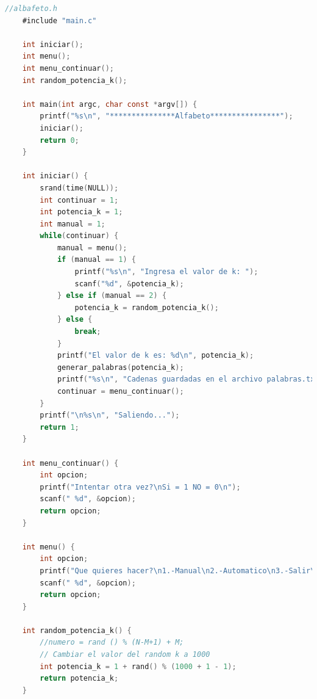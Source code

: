 	\begin{lstlisting}[language=C]
	//albafeto.h
	#include "main.c"
	
	int iniciar();
	int menu();
	int menu_continuar();
	int random_potencia_k();
	
	int main(int argc, char const *argv[]) {
		printf("%s\n", "***************Alfabeto****************");
		iniciar();
		return 0;
	}
	
	int iniciar() {
		srand(time(NULL));
		int continuar = 1;
		int potencia_k = 1;
		int manual = 1;
		while(continuar) {
			manual = menu();
			if (manual == 1) {
				printf("%s\n", "Ingresa el valor de k: ");
				scanf("%d", &potencia_k);
			} else if (manual == 2) {
				potencia_k = random_potencia_k();
			} else {
				break;
			}
			printf("El valor de k es: %d\n", potencia_k);
			generar_palabras(potencia_k);
			printf("%s\n", "Cadenas guardadas en el archivo palabras.txt");
			continuar = menu_continuar();
		}
		printf("\n%s\n", "Saliendo...");
		return 1;
	}
	
	int menu_continuar() {
		int opcion;
		printf("Intentar otra vez?\nSi = 1 NO = 0\n");
		scanf(" %d", &opcion);
		return opcion;
	}
	
	int menu() {
		int opcion;
		printf("Que quieres hacer?\n1.-Manual\n2.-Automatico\n3.-Salir\n");
		scanf(" %d", &opcion);
		return opcion;
	}
	
	int random_potencia_k() {
		//numero = rand () % (N-M+1) + M;
		// Cambiar el valor del random k a 1000
		int potencia_k = 1 + rand() % (1000 + 1 - 1);
		return potencia_k;
	}
	\end{lstlisting}
